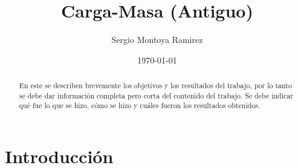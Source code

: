 \documentclass[a4paper, amsfonts, amssymb, amsmath, reprint, showkeys, nofootinbib, twoside]{revtex4-1}
\begin{document}
\title{Carga-Masa (Antiguo)}


\author{Sergio Montoya Ramirez}

  


\date{\today} %

\begin{abstract}

En este se describen brevemente los objetivos y los resultados del trabajo, por lo tanto se debe dar información completa pero corta del contenido del trabajo. Se debe indicar qué fue lo que se hizo, cómo se hizo y cuáles fueron los resultados obtenidos.

\end{abstract}

\maketitle

\section{Introducción}
\end{document}
